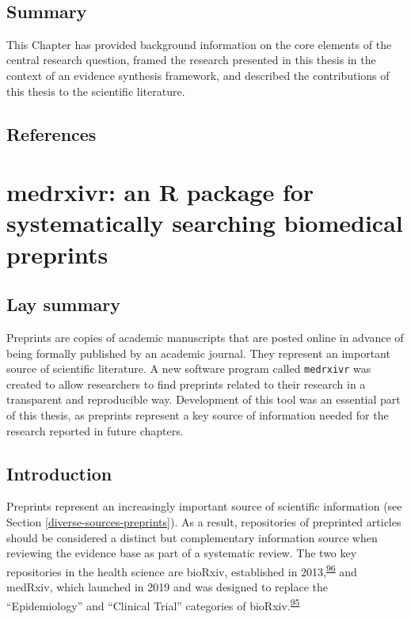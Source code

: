 \documentclass[a4paper, twoside]{templates/ociamthesis}
\begin{document}
~

\hypertarget{summary}{%
\section{Summary}\label{summary}}

This Chapter has provided background information on the core elements of the central research question, framed the research presented in this thesis in the context of an evidence synthesis framework, and described the contributions of this thesis to the scientific literature.

\newpage

\hypertarget{references}{%
\section{References}\label{references}}



\hypertarget{sys-rev-tools-heading}{%
\chapter{medrxivr: an R package for systematically searching biomedical preprints}\label{sys-rev-tools-heading}}

\minitoc 

\hypertarget{lay-summary-1}{%
\section{Lay summary}\label{lay-summary-1}}

Preprints are copies of academic manuscripts that are posted online in advance of being formally published by an academic journal. They represent an important source of scientific literature. A new software program called \texttt{medrxivr} was created to allow researchers to find preprints related to their research in a transparent and reproducible way. Development of this tool was an essential part of this thesis, as preprints represent a key source of information needed for the research reported in future chapters.

\hypertarget{sys-rev-tools-intro}{%
\section{Introduction}\label{sys-rev-tools-intro}}

Preprints represent an increasingly important source of scientific information (see Section \ref{diverse-sources-preprints}). As a result, repositories of preprinted articles should be considered a distinct but complementary information source when reviewing the evidence base as part of a systematic review. The two key repositories in the health science are bioRxiv, established in 2013,\textsuperscript{\protect\hyperlink{ref-sever2019}{96}} and medRxiv, which launched in 2019 and was designed to replace the ``Epidemiology'' and ``Clinical Trial'' categories of bioRxiv.\textsuperscript{\protect\hyperlink{ref-rawlinson2019}{95}}
\end{document}
